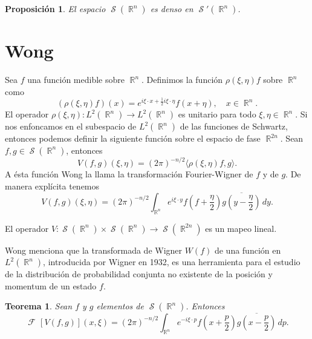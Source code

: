 \documentclass[a4paper]{report}
\DeclareMathOperator{\R}{\mathbb{R}}
\DeclareMathOperator{\Sz}{\mathcal S}
\DeclareMathOperator{\F}{\mathcal{F}\!}
\newtheorem{theorem}{Teorema}
\newtheorem{proposition}{Proposición}
\begin{document}
  \begin{proposition}
    El espacio $\Sz(\R^{n})$ es denso en $\Sz'(\R^{n})$.
  \end{proposition}

  \section{Wong}

  Sea $f$ una función medible sobre $\R^{n}$. Definimos la
  función $\rho(\xi,\eta)f$ sobre $\R^{n}$ como
  \begin{equation}
    (\rho(\xi,\eta)f)(x)
    = e^{i\xi \cdot x + \frac{1}{2} i \xi \cdot \eta}
    f(x+\eta),
    \quad x \in \R^{n}.
  \end{equation}
  El operador $\rho(\xi,\eta) : L^2(\R^{n}) \to L^2(\R^{n})$
  es unitario para todo $\xi, \eta \in \R^{n}$. Si nos
  enfoncamos en el subespacio de $L^2(\R^{n})$ de las
  funciones de Schwartz, entonces podemos definir la
  siguiente función sobre el espacio de fase $\R^{2n}$. Sean
  $f,g \in \Sz(\R^{n})$, entonces
  \begin{equation}
    V(f,g)(\xi,\eta)
    = (2\pi)^{-n / 2} \langle \rho(\xi,\eta)f, g \rangle.
  \end{equation}
  A ésta función Wong la llama la transformación
  Fourier-Wigner de $f$ y de $g$. De manera explícita
  tenemos 
  \begin{equation}
    V(f,g)(\xi,\eta)
    = (2\pi)^{-n / 2} \int_{\R^{n}} e^{i \xi \cdot y}
    f\left( f + \frac{\eta}{2} \right) \overline{g\left( y -
    \frac{\eta}{2}\right) } \, dy.
  \end{equation}

  El operador $V : \Sz(\R^{n}) \times \Sz(\R^{n}) \to
  \Sz(\R^{2n})$ es un mapeo lineal.

  Wong menciona que la transformada de Wigner $W(f)$ de una
  función en $L^2(\R^{n})$, introducida por Wigner en 1932,
  es una herramienta para el estudio de la distribución de
  probabilidad conjunta no existente de la posición y
  momentum de un estado $f$.

  \begin{theorem}
    Sean $f$ y $g$ elementos de $\Sz(\R^{n})$. Entonces
    \begin{equation}
      \F[V(f,g)](x,\xi)
      = (2\pi)^{-n / 2} \int_{\R^{n}} e^{-i \xi \cdot p
      } f\left( x + \frac{p}{2} \right)
      \overline{g\left( x - \frac{p}{2} \right)} \, dp.
    \end{equation}
  \end{theorem}
\end{document}
